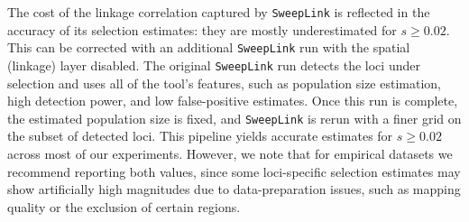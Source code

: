 \documentclass{article}
\newcommand{\SweepLink}{\texttt{SweepLink}\xspace}
\begin{document}
The cost of the linkage correlation captured by \SweepLink is reflected in the accuracy of its selection estimates: they are mostly underestimated for $s\geq 0.02$.
This can be corrected with an additional \SweepLink run with the spatial (linkage) layer disabled.
The original \SweepLink run detects the loci under selection and uses all of the tool's features, such as population size estimation, high detection power, and low false-positive estimates.
Once this run is complete, the estimated population size is fixed, and \SweepLink is rerun with a finer grid on the subset of detected loci.
This pipeline yields accurate estimates for $s\geq 0.02$ across most of our experiments.
However, we note that for empirical datasets we recommend reporting both values, since some loci-specific selection estimates may show artificially high magnitudes due to data-preparation issues, such as mapping quality or the exclusion of certain regions.




\end{document}

